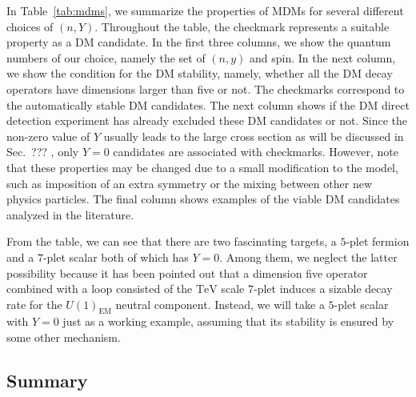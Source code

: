 \documentclass[12pt,twoside,book]{article}
\begin{document}
In Table~\ref{tab:mdms}, we summarize the properties of MDMs for several different choices of $(n, Y)$.
Throughout the table, the checkmark represents a suitable property as a DM candidate.
In the first three columns, we show the quantum numbers of our choice, namely the set of $(n,y)$ and spin.
In the next column, we show the condition for the DM stability, namely, whether all the DM decay operators have dimensions larger than five or not.
The checkmarks correspond to the automatically stable DM candidates.
The next column shows if the DM direct detection experiment has already excluded these DM candidates or not.
Since the non-zero value of $Y$ usually leads to the large cross section as will be discussed in Sec.~??? , only $Y=0$ candidates are associated with checkmarks.
However, note that these properties may be changed due to a small modification to the model, such as imposition of an extra symmetry or the mixing between other new physics particles.
The final column shows examples of the viable DM candidates analyzed in the literature.

From the table, we can see that there are two fascinating targets, a $5$-plet fermion and a $7$-plet scalar both of which has $Y=0$.
Among them, we neglect the latter possibility because it has been pointed out \cite{DiLuzio:2015oha, DelNobile:2015bqo} that a dimension five operator combined with a loop consisted of the $\mathrm{TeV}$ scale $7$-plet induces a sizable decay rate for the $U(1)_{\mathrm{EM}}$ neutral component.
Instead, we will take a $5$-plet scalar with $Y=0$ just as a working example, assuming that its stability is ensured by some other mechanism.


\subsection{Summary}
\end{document}
